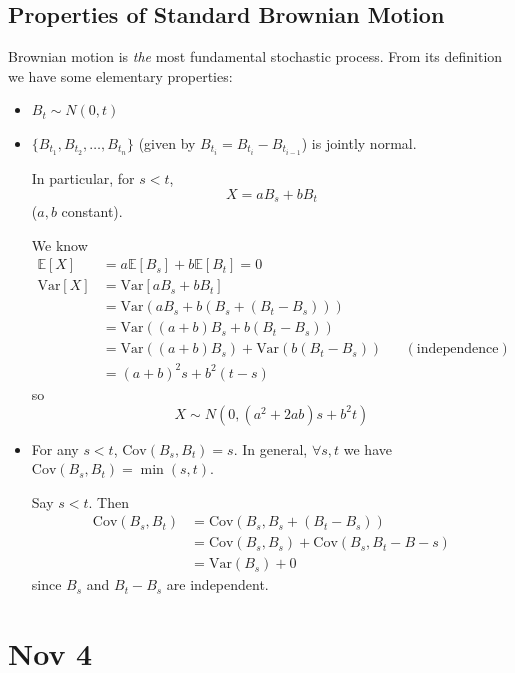 \documentclass[12pt]{report}
\newcommand{\E}{\mathbb{E}}
\newcommand{\Cov}{\text{Cov}}
\newcommand{\Var}{\text{Var}}
\begin{document}
\subsection*{Properties of Standard Brownian Motion}
    Brownian motion is \emph{the} most fundamental stochastic process. From its definition we have some elementary properties:
        \begin{itemize}
            \item $B_t \sim N(0, t)$
            \item $\{B_{t_1}, B_{t_2}, \dots, B_{t_n}\}$ (given by $B_{t_i} = B_{t_i} - B_{t_{i-1}}$) is jointly normal. 
            
            In particular, for $s < t$, 
            \[X = aB_s + bB_t\] 
            ($a, b$ constant).

            We know
            \begin{align*}
                \E[X] &= a\E[B_s] + b\E[B_t] = 0\\ 
                \Var[X] &= \Var[aB_s + bB_t]\\ 
                    &= \Var(aB_s + b(B_s + (B_t - B_s)))\\ 
                    &= \Var((a + b) B_s + b(B_t - B_s))\\ 
                    &= \Var((a+ b) B_s) + \Var(b(B_t - B_s)) && (\text{independence})\\ 
                    &= (a + b)^2 s + b^2(t - s)
            \end{align*}
            so 
            \[X \sim N(0, (a^2 + 2ab)s + b^2t)\]
            
            \item For any $s < t$, $\Cov(B_s, B_t) = s$. In general, $\forall s, t$ we have $\Cov(B_s, B_t) = \min(s, t)$. 
            
            Say $s < t$. Then 
            \begin{align*}
                \Cov(B_s, B_t) &= \Cov(B_s, B_s + (B_t - B_s))\\ 
                & = \Cov(B_s, B_s) + \Cov(B_s, B_t - B-s) \\ 
                &= \Var(B_s) + 0
            \end{align*}
            since $B_s$ and $B_t - B_s$ are independent.
        \end{itemize}

\section{Nov 4}
\end{document}
